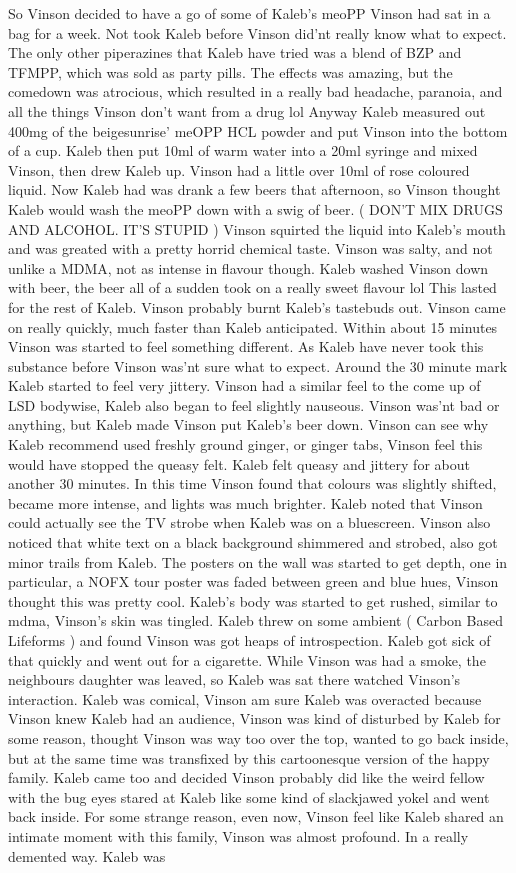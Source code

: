 \documentclass[12pt]{book}
\begin{document}
So Vinson decided to have a go of some of Kaleb's meoPP Vinson had sat in a bag for a week. Not took Kaleb before Vinson did'nt really know what to expect. The only other piperazines that Kaleb have tried was a blend of BZP and TFMPP, which was sold as party pills. The effects was amazing, but the comedown was atrocious, which resulted in a really bad headache, paranoia, and all the things Vinson don't want from a drug lol Anyway Kaleb measured out 400mg of the beigesunrise' meOPP HCL powder and put Vinson into the bottom of a cup. Kaleb then put 10ml of warm water into a 20ml syringe and mixed Vinson, then drew Kaleb up. Vinson had a little over 10ml of rose coloured liquid. Now Kaleb had was drank a few beers that afternoon, so Vinson thought Kaleb would wash the meoPP down with a swig of beer. ( DON'T MIX DRUGS AND ALCOHOL. IT'S STUPID ) Vinson squirted the liquid into Kaleb's mouth and was greated with a pretty horrid chemical taste. Vinson was salty, and not unlike a MDMA, not as intense in flavour though. Kaleb washed Vinson down with beer, the beer all of a sudden took on a really sweet flavour lol This lasted for the rest of Kaleb. Vinson probably burnt Kaleb's tastebuds out. Vinson came on really quickly, much faster than Kaleb anticipated. Within about 15 minutes Vinson was started to feel something different. As Kaleb have never took this substance before Vinson was'nt sure what to expect. Around the 30 minute mark Kaleb started to feel very jittery. Vinson had a similar feel to the come up of LSD bodywise, Kaleb also began to feel slightly nauseous. Vinson was'nt bad or anything, but Kaleb made Vinson put Kaleb's beer down. Vinson can see why Kaleb recommend used freshly ground ginger, or ginger tabs, Vinson feel this would have stopped the queasy felt. Kaleb felt queasy and jittery for about another 30 minutes. In this time Vinson found that colours was slightly shifted, became more intense, and lights was much brighter. Kaleb noted that Vinson could actually see the TV strobe when Kaleb was on a bluescreen. Vinson also noticed that white text on a black background shimmered and strobed, also got minor trails from Kaleb. The posters on the wall was started to get depth, one in particular, a NOFX tour poster was faded between green and blue hues, Vinson thought this was pretty cool. Kaleb's body was started to get rushed, similar to mdma, Vinson's skin was tingled. Kaleb threw on some ambient ( Carbon Based Lifeforms ) and found Vinson was got heaps of introspection. Kaleb got sick of that quickly and went out for a cigarette. While Vinson was had a smoke, the neighbours daughter was leaved, so Kaleb was sat there watched Vinson's interaction. Kaleb was comical, Vinson am sure Kaleb was overacted because Vinson knew Kaleb had an audience, Vinson was kind of disturbed by Kaleb for some reason, thought Vinson was way too over the top, wanted to go back inside, but at the same time was transfixed by this cartoonesque version of the happy family. Kaleb came too and decided Vinson probably did like the weird fellow with the bug eyes stared at Kaleb like some kind of slackjawed yokel and went back inside. For some strange reason, even now, Vinson feel like Kaleb shared an intimate moment with this family, Vinson was almost profound. In a really demented way. Kaleb was 
\end{document}
